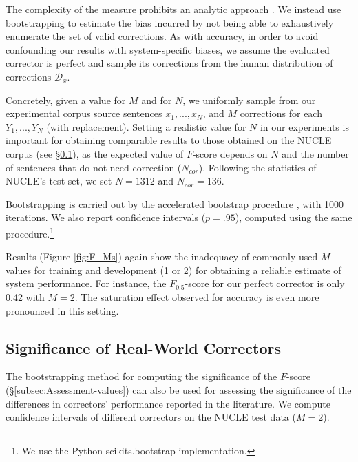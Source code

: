 \documentclass[letterpaper, 11pt]{article}
\begin{document}
The complexity of the measure prohibits an analytic approach \cite{yeh2000more}.
We instead use bootstrapping to estimate the bias incurred by not being able to exhaustively enumerate the set of valid corrections.
As with accuracy, in order to avoid confounding our results with system-specific biases,
we assume the evaluated corrector is perfect and sample its corrections from the human distribution of corrections $\mathcal{D}_x$.

Concretely, given a value for $M$ and for $N$, we uniformly sample from our experimental corpus source sentences $x_1,...,x_N$, and $M$ corrections for each $Y_1,...,Y_N$ (with replacement).
Setting a realistic value for $N$ in our experiments is important for obtaining comparable results to those obtained on the NUCLE corpus (see \S\ref{sec:real_world}),
as the expected value of $F$-score depends on $N$ and the number of sentences that do not need correction ($N_{cor}$).
Following the statistics of NUCLE's test set, we set $N=1312$ and $N_{cor}=136$.

Bootstrapping is carried out by the accelerated bootstrap procedure \cite{efron1987better}, with 1000 iterations.
We also report confidence intervals ($p=.95$), computed using the same procedure.\footnote{We use the Python scikits.bootstrap implementation.}
%

Results (Figure \ref{fig:F_Ms}) again show the inadequacy of commonly used
$M$ values for training and development (1 or 2) for obtaining a reliable estimate
of system performance.
For instance, the $F_{0.5}$-score for our perfect corrector is only 0.42 with $M=2$.
The saturation effect observed for accuracy is even more pronounced in this setting.
\subsection{Significance of Real-World Correctors}\label{sec:real_world}

The bootstrapping method for computing the significance of the $F$-score (\S\ref{subsec:Assessment-values}) 
can also be used for assessing the significance of the differences in correctors' performance
reported in the literature.
We compute confidence intervals of different correctors on the NUCLE
test data ($M=2$).
\end{document}
